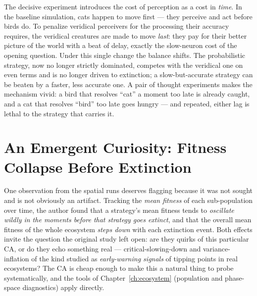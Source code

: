 The decisive experiment introduces the cost of perception as a cost in
\emph{time}.  In the baseline simulation, cats happen to move first ---
they perceive and act before birds do.  To penalize veridical
perceivers for the processing their accuracy requires, the veridical
creatures are made to move \emph{last}: they pay for their better
picture of the world with a beat of delay, exactly the slow-neuron cost
of the opening question.  Under this single change the balance shifts.
The probabilistic strategy, now no longer strictly dominated, competes
with the veridical one on even terms and is no longer driven to
extinction; a slow-but-accurate strategy can be beaten by a
faster, less accurate one.  A pair of thought experiments makes the
mechanism vivid: a bird that resolves ``cat'' a moment too late is
already caught, and a cat that resolves ``bird'' too late goes hungry
--- and repeated, either lag is lethal to the strategy that carries it.


\section{An Emergent Curiosity: Fitness Collapse Before Extinction}

One observation from the spatial runs deserves flagging because it was
not sought and is not obviously an artifact.  Tracking the \emph{mean
fitness} of each sub-population over time, the author found that a
strategy's mean fitness tends to \emph{oscillate wildly in the moments
before that strategy goes extinct}, and that the overall mean fitness of
the whole ecosystem \emph{steps down} with each extinction event.  Both
effects invite the question the original study left open: are they
quirks of this particular CA, or do they echo something real ---
critical-slowing-down and variance-inflation of the kind studied as
\emph{early-warning signals} of tipping points in real ecosystems?  The
CA is cheap enough to make this a natural thing to probe systematically,
and the tools of Chapter~\ref{ch:ecosystem} (population and phase-space
diagnostics) apply directly.

